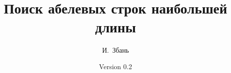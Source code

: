 \documentclass[11pt,a4paper]{article}
\theoremstyle{plain}
\theoremstyle{definition}
\theoremstyle{remark}
\begin{document}
\pagestyle{myheadings}

\makeatletter
\renewcommand{\@oddhead}{\hfil Поиск абелевых строк наибольшей длины\ \hfil\thepage}
\makeatother

\title{Поиск абелевых строк наибольшей длины}
\author{И.~Збань}
\date{Version 0.2}

\maketitle

\tableofcontents







\clearpage

\end{document}
